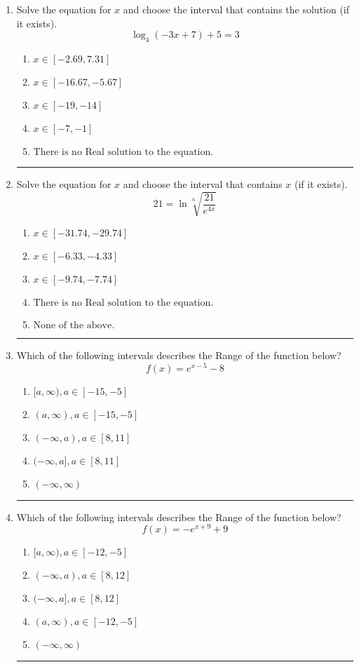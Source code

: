 \documentclass[14pt]{extbook}
\newcommand{\litem}[1]{\item#1\hspace*{-1cm}\rule{\textwidth}{0.4pt}}
\begin{document}
\begin{enumerate}
\litem{
Solve the equation for $x$ and choose the interval that contains the solution (if it exists).\[ \log_{4}{(-3x+7)}+5 = 3 \]\begin{enumerate}[label=\Alph*.]
\item \( x \in [-2.69, 7.31] \)
\item \( x \in [-16.67, -5.67] \)
\item \( x \in [-19, -14] \)
\item \( x \in [-7, -1] \)
\item \( \text{There is no Real solution to the equation.} \)

\end{enumerate} }
\litem{
 Solve the equation for $x$ and choose the interval that contains $x$ (if it exists).\[  21 = \ln{\sqrt[6]{\frac{21}{e^{4x}}}} \]\begin{enumerate}[label=\Alph*.]
\item \( x \in [-31.74, -29.74] \)
\item \( x \in [-6.33, -4.33] \)
\item \( x \in [-9.74, -7.74] \)
\item \( \text{There is no Real solution to the equation.} \)
\item \( \text{None of the above.} \)

\end{enumerate} }
\litem{
Which of the following intervals describes the Range of the function below?\[ f(x) = e^{x-5}-8 \]\begin{enumerate}[label=\Alph*.]
\item \( [a, \infty), a \in [-15, -5] \)
\item \( (a, \infty), a \in [-15, -5] \)
\item \( (-\infty, a), a \in [8, 11] \)
\item \( (-\infty, a], a \in [8, 11] \)
\item \( (-\infty, \infty) \)

\end{enumerate} }
\litem{
Which of the following intervals describes the Range of the function below?\[ f(x) = -e^{x+9}+9 \]\begin{enumerate}[label=\Alph*.]
\item \( [a, \infty), a \in [-12, -5] \)
\item \( (-\infty, a), a \in [8, 12] \)
\item \( (-\infty, a], a \in [8, 12] \)
\item \( (a, \infty), a \in [-12, -5] \)
\item \( (-\infty, \infty) \)


\end{enumerate}}
\end{enumerate}
\end{document}

